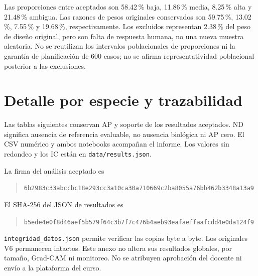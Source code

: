 \documentclass[10pt]{article}
\begin{document}
Las proporciones entre aceptados son 58.42\,\% baja, 11.86\,\% media,
8.25\,\% alta y 21.48\,\% ambigua. Las razones de pesos originales conservados
son 59.75\,\%, 13.02\,\%, 7.55\,\% y 19.68\,\%, respectivamente.
Los excluidos representan 2.38\,\% del peso de diseño original, pero son falta
de respuesta humana, no una nueva muestra aleatoria. No se reutilizan los
intervalos poblacionales de proporciones ni la garantía de planificación
de 600 casos; no se afirma representatividad poblacional posterior a las exclusiones.

\newpage
\section{Detalle por especie y trazabilidad}
Las tablas siguientes conservan AP y soporte de los resultados aceptados.
ND significa ausencia de referencia evaluable, no ausencia biológica ni AP cero.
El CSV numérico y ambos notebooks acompañan el informe. Los valores sin redondeo
y los IC están en \texttt{data/results.json}.


La firma del análisis aceptado es
\begin{quote}\small\nolinkurl{6b2983c33abccbc18e293cc3a10ca30a710669c2ba8055a76bb462b3348a13a9}\end{quote}
El SHA-256 del JSON de resultados es
\begin{quote}\small\nolinkurl{b5ede4e0f8d46aef5b579f64c3b7f7c476b4aeb93eafaeffaafcdd4e0da124f9}\end{quote}
\texttt{integridad\_datos.json} permite verificar las copias byte a byte. Los
originales V6 permanecen intactos. Este anexo no altera sus resultados globales,
por tamaño, Grad-CAM ni monitoreo. No se atribuyen aprobación del docente ni
envío a la plataforma del curso.
\end{document}
